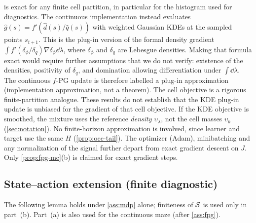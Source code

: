 \begin{remark}\label{rem:fpg-kde}
 is exact for any finite cell partition, in particular for the histogram used for diagnostics.
The continuous implementation instead evaluates $\hat g(s)=f'(\hat d(s)/\hat q(s))$ with weighted Gaussian KDEs at the sampled points $s_{t+1}$.
This is the plug-in version of the formal density gradient $\int f'(\delta_\phi/\delta_q)\nabla\delta_\phi\dd\lambda$, where $\delta_\phi$ and $\delta_q$ are Lebesgue densities.
Making that formula exact would require further assumptions that we do not verify: existence of the densities, positivity of $\delta_q$, and domination allowing differentiation under $\int\dd\lambda$.
The continuous $f$-PG update is therefore labelled a plug-in approximation (implementation approximation, not a theorem).
The cell objective is a rigorous finite-partition analogue. These results do not establish that the KDE plug-in update is unbiased for the gradient of that cell objective.
If the KDE objective is smoothed, the mixture uses the reference \emph{density} $\upsilon_\lambda$, not the cell masses $\upsilon_b$ (\cref{sec:notation}).
No finite-horizon approximation is involved, since learner and target use the same $H$ (\cref{prop:occ-tail}).
The optimizer (Adam), minibatching and any normalization of the signal further depart from exact gradient descent on $J$. Only \cref{prop:fpg-mc}(b) is claimed for exact gradient steps.
\end{remark}

\subsection{State--action extension (finite diagnostic)}\label{sec:fpg-sa}

The following lemma holds under \cref{ass:mdp} alone; finiteness of $\mathcal{S}$ is used only in part~(b).
Part~(a) is also used for the continuous maze (after \cref{ass:fpg}).

